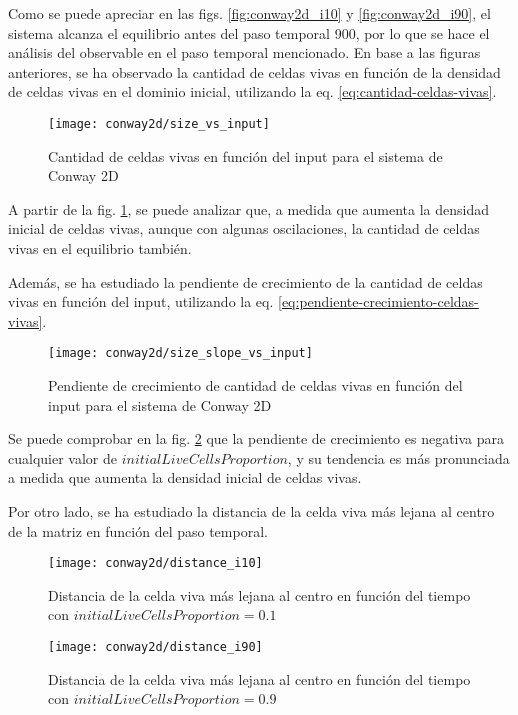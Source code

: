 Como se puede apreciar en las figs. \ref{fig:conway2d_i10} y \ref{fig:conway2d_i90}, el sistema alcanza el equilibrio
antes del paso temporal 900, por lo que se hace el análisis del observable en el paso temporal mencionado.
En base a las figuras anteriores, se ha observado la cantidad de celdas vivas en función de la densidad de celdas
vivas en el dominio inicial, utilizando la eq. \ref{eq:cantidad-celdas-vivas}.

\begin{figure}[H]
    \centering
    \texttt{[image: conway2d/size\_vs\_input]}
    \caption{Cantidad de celdas vivas en función del input para el sistema de Conway 2D}
    \label{fig:conway2d_size_vs_input}
\end{figure}

A partir de la fig. \ref{fig:conway2d_size_vs_input}, se puede analizar que, a medida que aumenta la densidad inicial de
celdas vivas, aunque con algunas oscilaciones, la cantidad de celdas vivas en el equilibrio también.

Además, se ha estudiado la pendiente de crecimiento de la cantidad de celdas vivas en función del input,
utilizando la eq. \ref{eq:pendiente-crecimiento-celdas-vivas}.

\begin{figure}[H]
    \centering
    \texttt{[image: conway2d/size\_slope\_vs\_input]}
    \caption{Pendiente de crecimiento de cantidad de celdas vivas en función del input para el sistema de Conway 2D}
    \label{fig:conway2d_size_slope_vs_input}
\end{figure}

Se puede comprobar en la fig. \ref{fig:conway2d_size_slope_vs_input} que la pendiente de crecimiento es negativa
para cualquier valor de $initialLiveCellsProportion$, y su tendencia es más pronunciada a medida que aumenta la
densidad inicial de celdas vivas.

Por otro lado, se ha estudiado la distancia de la celda viva más lejana al centro de la matriz en función del
paso temporal.

\begin{figure}[H]
    \centering
    \texttt{[image: conway2d/distance\_i10]}
    \caption{Distancia de la celda viva más lejana al centro en función del tiempo con $initialLiveCellsProportion = 0.1$}
    \label{fig:conway2d_d10}
\end{figure}
\begin{figure}[H]
    \centering
    \texttt{[image: conway2d/distance\_i90]}
    \caption{Distancia de la celda viva más lejana al centro en función del tiempo con $initialLiveCellsProportion = 0.9$}
    \label{fig:conway2d_d90}
\end{figure}

